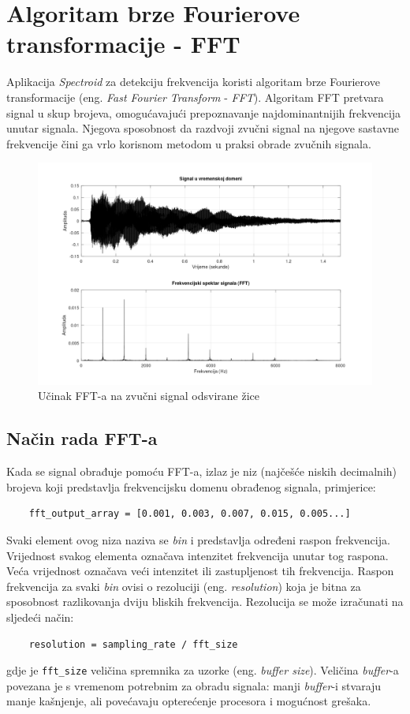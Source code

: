 \documentclass[times, utf8, diplomski, numeric]{fer}
\begin{document}
\chapter{Algoritam brze Fourierove transformacije - FFT}
Aplikacija \textit{Spectroid} za detekciju frekvencija koristi algoritam brze Fourierove transformacije (eng. \textit{Fast Fourier Transform} - \textit{FFT}).\cite{reinke_2018} Algoritam FFT pretvara signal u skup brojeva, omogućavajući prepoznavanje najdominantnijih frekvencija unutar signala. Njegova sposobnost da razdvoji zvučni signal na njegove sastavne frekvencije čini ga vrlo korisnom metodom u praksi obrade zvučnih signala.\cite{gustine_2021}

\begin{figure}[H]
	\centerline{\includegraphics[width=1.2\textwidth]{FFT_spectrum.png}}
	\caption{Učinak FFT-a na zvučni signal odsvirane žice}
	\label{fig}
\end{figure}

\section{Način rada FFT-a}
Kada se signal obrađuje pomoću FFT-a, izlaz je niz (najčešće niskih decimalnih) brojeva koji predstavlja frekvencijsku domenu obrađenog signala, primjerice:
\begin{verbatim}
	fft_output_array = [0.001, 0.003, 0.007, 0.015, 0.005...]
\end{verbatim}
Svaki element ovog niza naziva se \textit{bin} i predstavlja određeni raspon frekvencija. Vrijednost svakog elementa označava intenzitet frekvencija unutar tog raspona. Veća vrijednost označava veći intenzitet ili zastupljenost tih frekvencija. Raspon frekvencija za svaki \textit{bin} ovisi o rezoluciji (eng. \textit{resolution}) koja je bitna za sposobnost razlikovanja dviju bliskih frekvencija. Rezolucija se može izračunati na sljedeći način:
\begin{verbatim}
	resolution = sampling_rate / fft_size
\end{verbatim}
gdje je \verb|fft_size| veličina spremnika za uzorke (eng. \textit{buffer size}).\cite{lourde2009digital} Veličina \textit{buffer}-a povezana je s vremenom potrebnim za obradu signala: manji \textit{buffer}-i stvaraju manje kašnjenje, ali povećavaju opterećenje procesora i mogućnost grešaka.\cite{focusrite_2022}
\end{document}
